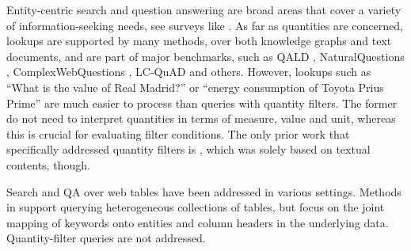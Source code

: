 Entity-centric search and question answering are broad areas
that cover a variety of information-seeking needs, see surveys
like \cite{DBLP:series/irs/Balog18,DBLP:journals/kais/DiefenbachLSM18,DBLP:journals/access/HuangXHWQFZPW20,reinanda2020knowledge}.
As far as quantities are concerned, lookups are supported
by many methods, over both knowledge graphs and text documents,
and are part of major benchmarks,
such as QALD \cite{DBLP:conf/clef/UngerFLNCCW15}, NaturalQuestions \cite{DBLP:journals/tacl/KwiatkowskiPRCP19},
ComplexWebQuestions \cite{DBLP:conf/naacl/TalmorB18},
LC-QuAD \cite{DBLP:conf/semweb/DubeyBA019} and others.
However, lookups such as ``What is the value of Real Madrid?''
or ``energy consumption of Toyota Prius Prime'' are much
easier to process than queries with quantity filters.
The former do not need to interpret quantities in terms
of measure, value and unit, whereas this is crucial for
evaluating filter conditions.
The only prior work that specifically
addressed quantity filters is \cite{DBLP:conf/semweb/HoIPBW19,DBLP:conf/wsdm/HoPKBW20}, which was solely based on
textual contents, though.
%

Search and QA over web tables have been addressed in various settings.
Methods in \cite{DBLP:journals/pvldb/PimplikarS12,DBLP:conf/kdd/SarawagiC14,DBLP:conf/sigmod/YakoutGCC12,DBLP:journals/corr/abs-2001-03272} support
querying heterogeneous collections of tables, but 
focus
on the joint mapping of keywords onto entities and column headers in the underlying data.
Quantity-filter queries are not addressed.





